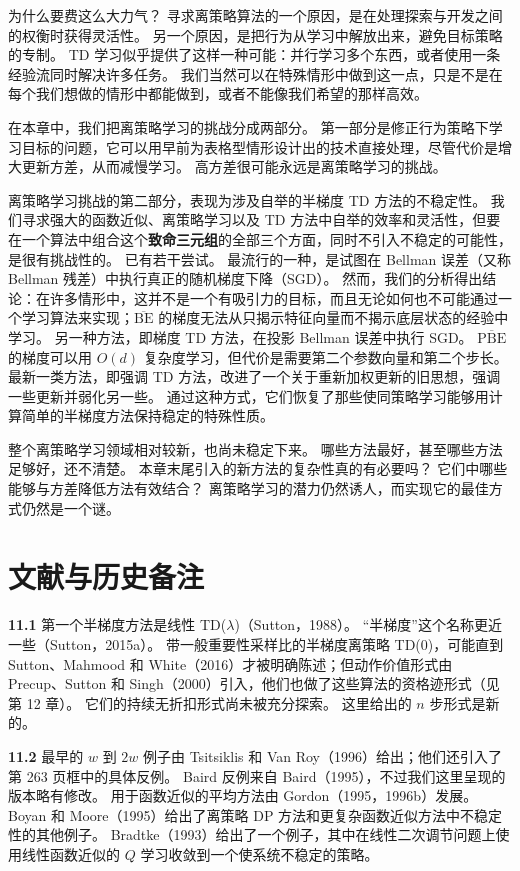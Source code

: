 \documentclass[UTF8,12pt,a4paper,fontset=fandol]{ctexart}
\begin{document}
为什么要费这么大力气？
寻求离策略算法的一个原因，是在处理探索与开发之间的权衡时获得灵活性。
另一个原因，是把行为从学习中解放出来，避免目标策略的专制。
TD 学习似乎提供了这样一种可能：并行学习多个东西，或者使用一条经验流同时解决许多任务。
我们当然可以在特殊情形中做到这一点，只是不是在每个我们想做的情形中都能做到，或者不能像我们希望的那样高效。

在本章中，我们把离策略学习的挑战分成两部分。
第一部分是修正行为策略下学习目标的问题，它可以用早前为表格型情形设计出的技术直接处理，尽管代价是增大更新方差，从而减慢学习。
高方差很可能永远是离策略学习的挑战。

离策略学习挑战的第二部分，表现为涉及自举的半梯度 TD 方法的不稳定性。
我们寻求强大的函数近似、离策略学习以及 TD 方法中自举的效率和灵活性，但要在一个算法中组合这个\textbf{致命三元组}的全部三个方面，同时不引入不稳定的可能性，是很有挑战性的。
已有若干尝试。
最流行的一种，是试图在 Bellman 误差（又称 Bellman 残差）中执行真正的随机梯度下降（SGD）。
然而，我们的分析得出结论：在许多情形中，这并不是一个有吸引力的目标，而且无论如何也不可能通过一个学习算法来实现；$\overline{\mathrm{BE}}$ 的梯度无法从只揭示特征向量而不揭示底层状态的经验中学习。
另一种方法，即梯度 TD 方法，在投影 Bellman 误差中执行 SGD。
$\overline{\mathrm{PBE}}$ 的梯度可以用 $O(d)$ 复杂度学习，但代价是需要第二个参数向量和第二个步长。
最新一类方法，即强调 TD 方法，改进了一个关于重新加权更新的旧思想，强调一些更新并弱化另一些。
通过这种方式，它们恢复了那些使同策略学习能够用计算简单的半梯度方法保持稳定的特殊性质。

整个离策略学习领域相对较新，也尚未稳定下来。
哪些方法最好，甚至哪些方法足够好，还不清楚。
本章末尾引入的新方法的复杂性真的有必要吗？
它们中哪些能够与方差降低方法有效结合？
离策略学习的潜力仍然诱人，而实现它的最佳方式仍然是一个谜。

\section*{文献与历史备注}

\noindent\textbf{11.1}
第一个半梯度方法是线性 TD($\lambda$)（Sutton，1988）。
“半梯度”这个名称更近一些（Sutton，2015a）。
带一般重要性采样比的半梯度离策略 TD(0)，可能直到 Sutton、Mahmood 和 White（2016）才被明确陈述；但动作价值形式由 Precup、Sutton 和 Singh（2000）引入，他们也做了这些算法的资格迹形式（见第 12 章）。
它们的持续无折扣形式尚未被充分探索。
这里给出的 $n$ 步形式是新的。

\noindent\textbf{11.2}
最早的 $w$ 到 $2w$ 例子由 Tsitsiklis 和 Van Roy（1996）给出；他们还引入了第 263 页框中的具体反例。
Baird 反例来自 Baird（1995），不过我们这里呈现的版本略有修改。
用于函数近似的平均方法由 Gordon（1995，1996b）发展。
Boyan 和 Moore（1995）给出了离策略 DP 方法和更复杂函数近似方法中不稳定性的其他例子。
Bradtke（1993）给出了一个例子，其中在线性二次调节问题上使用线性函数近似的 $Q$ 学习收敛到一个使系统不稳定的策略。
\end{document}
